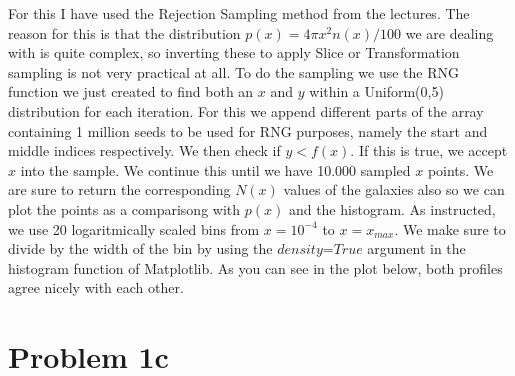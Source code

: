 For this I have used the Rejection Sampling method from the lectures. The reason for this is that the distribution $p(x) = 4\pi x^2 n(x)/100$ we are dealing with is quite complex, so inverting these to apply Slice or Transformation sampling is not very practical at all. To do the sampling we use the RNG function we just created to find both an $x$ and $y$ within a Uniform(0,5) distribution for each iteration. For this we append different parts of the array containing 1 million seeds to be used for RNG purposes, namely the start and middle indices respectively. We then check if $y < f(x)$. If this is true, we accept $x$ into the sample. We continue this until we have 10.000 sampled $x$ points. We are sure to return the corresponding $N(x)$ values of the galaxies also so we can plot the points as a comparisong with $p(x)$ and the histogram. As instructed, we use 20 logaritmically scaled bins from $x = 10^{-4}$ to $x = x_{max}$. We make sure to divide by the width of the bin by using the $\textit{density=True}$ argument in the histogram function of Matplotlib. As you can see in the plot below, both profiles agree nicely with each other. 


\section*{Problem 1c}



%